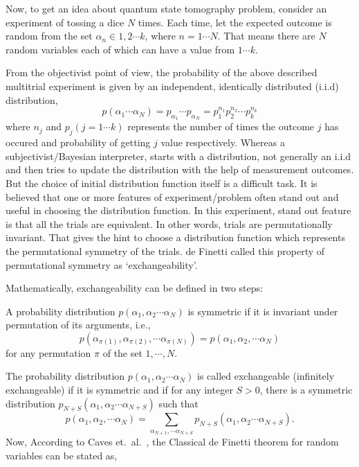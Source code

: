 Now, to get an idea about quantum state tomography problem, consider an experiment of tossing a dice $N$ times. Each time, let the expected outcome is random from the set $\alpha_{n} \in 1, 2 \cdots k$, where $n = 1 \cdots N$. That means there are $N$ random variables each of which can have a value from $1 \cdots k$.

From the objectivist point of view, the probability of the above described multitrial experiment is given by an independent, identically distributed (i.i.d) distribution,
$$
p(\alpha_{1} \cdots \alpha_{N}) = p_{\alpha_{1}} \cdots p_{\alpha_{N}} = p_{1}^{n_{1}} p_{2}^{n_{2}} \cdots p_{k}^{n_{k}}
$$ 
where $n_{j}$ and $p_{j} (j= 1 \cdots k)$ represents the number of times the outcome $j$ has occured and probability of getting $j$ value respectively. Whereas a  subjectivist/Bayesian interpreter, starts with a distribution, not generally an i.i.d and then tries to update the distribution with the help of measurement outcomes. But the choice of initial distribution function itself is a difficult task. It is believed that one or more features of experiment/problem often stand out and useful in choosing the distribution function. In this experiment, stand out feature is that all the trials are equivalent. In other words, trials are permutationally invariant. That gives the hint to choose a distribution function which represents the permutational symmetry of the trials. de Finetti called this property of permutational symmetry as `exchangeability'.

Mathematically, exchangeability can be defined in two steps:

A probability distribution $p(\alpha_{1}, \alpha_{2} \cdots \alpha_{N} )$ is symmetric if it is invariant under permutation of its arguments, i.e., 
$$ 
p(\alpha_{\pi(1)}, \alpha_{\pi(2)}, \cdots \alpha_{\pi(N)}) = p (\alpha_{1}, \alpha_{2}, \cdots \alpha_{N})
$$ 
for any permutation $\pi$ of the set $1, \cdots ,N$.

The probability distribution $p(\alpha_{1}, \alpha_{2} \cdots \alpha_{N})$ is called exchangeable (infinitely exchangeable) if it is symmetric and if for any integer $S > 0$, there is a symmetric distribution $p_{N+S} (\alpha_{1}, \alpha_{2} \cdots \alpha_{N+S})$ such that
$$ 
p(\alpha_{1}, \alpha_{2}, \cdots \alpha_{N}) = \sum_{\alpha_{N+1},\cdots \alpha_{N+S}} p_{N+S} (\alpha_{1}, \alpha_{2} \cdots \alpha_{N+S}).
$$
Now, According to Caves et.\ al.\ \cite{chap27-key8}, the Classical de Finetti theorem for random variables can be stated as,


